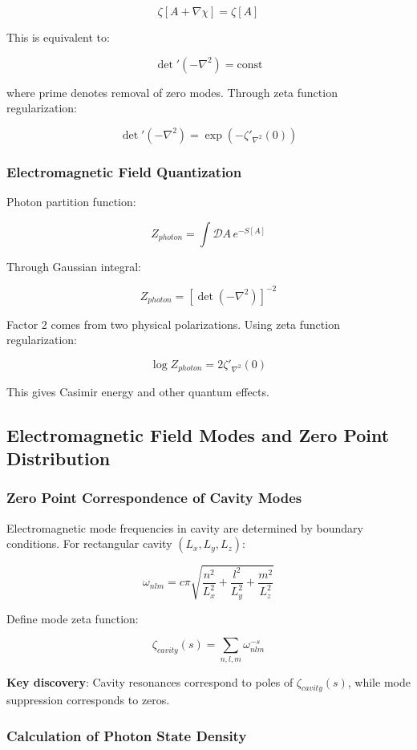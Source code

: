 \documentclass[12pt,a4paper]{article}
\begin{document}
$$\zeta[A + \nabla\chi] = \zeta[A]$$

This is equivalent to:

$$\det'(-\nabla^2) = \text{const}$$

where prime denotes removal of zero modes. Through zeta function regularization:

$$\det'(-\nabla^2) = \exp(-\zeta'_{\nabla^2}(0))$$

\subsubsection{Electromagnetic Field Quantization}

Photon partition function:

$$Z_{photon} = \int \mathcal{D}A \, e^{-S[A]}$$

Through Gaussian integral:

$$Z_{photon} = [\det(-\nabla^2)]^{-2}$$

Factor 2 comes from two physical polarizations. Using zeta function regularization:

$$\log Z_{photon} = 2\zeta'_{\nabla^2}(0)$$

This gives Casimir energy and other quantum effects.

\subsection{Electromagnetic Field Modes and Zero Point Distribution}

\subsubsection{Zero Point Correspondence of Cavity Modes}

Electromagnetic mode frequencies in cavity are determined by boundary conditions. For rectangular cavity $(L_x, L_y, L_z)$:

$$\omega_{nlm} = c\pi\sqrt{\frac{n^2}{L_x^2} + \frac{l^2}{L_y^2} + \frac{m^2}{L_z^2}}$$

Define mode zeta function:

$$\zeta_{cavity}(s) = \sum_{n,l,m} \omega_{nlm}^{-s}$$

\textbf{Key discovery}: Cavity resonances correspond to poles of $\zeta_{cavity}(s)$, while mode suppression corresponds to zeros.

\subsubsection{Calculation of Photon State Density}
\end{document}
